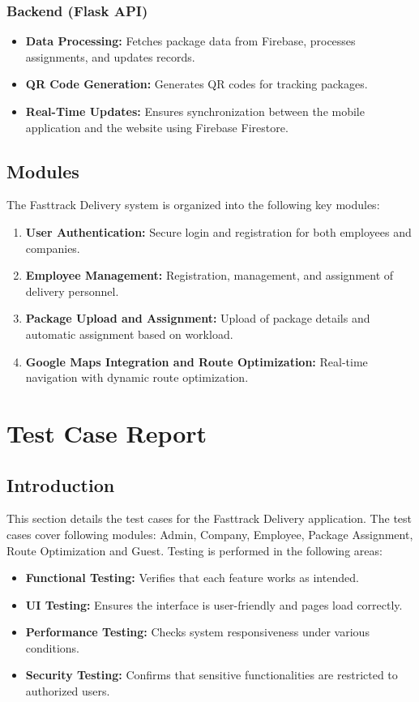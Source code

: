 \documentclass{article}
\begin{document}
\subsubsection{Backend (Flask API)}
\begin{itemize}
    \item \textbf{Data Processing:} Fetches package data from Firebase, processes assignments, and updates records.
    \item \textbf{QR Code Generation:} Generates QR codes for tracking packages.
    \item \textbf{Real-Time Updates:} Ensures synchronization between the mobile application and the website using Firebase Firestore.
\end{itemize}

\subsection{Modules}
The Fasttrack Delivery system is organized into the following key modules:
\begin{enumerate}
    \item \textbf{User Authentication:} Secure login and registration for both employees and companies.
    \item \textbf{Employee Management:} Registration, management, and assignment of delivery personnel.
    \item \textbf{Package Upload and Assignment:} Upload of package details and automatic assignment based on workload.
    \item \textbf{Google Maps Integration and Route Optimization:} Real-time navigation with dynamic route optimization.

\end{enumerate}

\newpage

\section{Test Case Report}

\subsection{Introduction}
This section details the test cases for the Fasttrack Delivery application. The test cases cover following modules: Admin, Company, Employee, Package Assignment, Route Optimization and Guest. Testing is performed in the following areas:
\begin{itemize}
    \item \textbf{Functional Testing:} Verifies that each feature works as intended.
    \item \textbf{UI Testing:} Ensures the interface is user-friendly and pages load correctly.
    \item \textbf{Performance Testing:} Checks system responsiveness under various conditions.
    \item \textbf{Security Testing:} Confirms that sensitive functionalities are restricted to authorized users.
\end{itemize}
\end{document}
